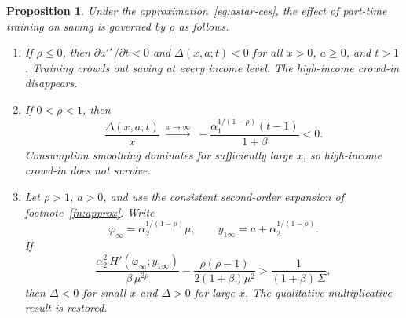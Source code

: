 \documentclass[12pt]{article}
\newtheorem{proposition}{Proposition}
\begin{document}
\begin{proposition}\label{prop:dadt-ces}
    Under the approximation~\eqref{eq:astar-ces}, the effect of part-time training on saving is governed by $\rho$ as follows.
    \begin{enumerate}
        \item If $\rho\le 0$, then $\partial a'^{\star}/\partial t<0$ and $\Delta(x,a;t)<0$ for all $x>0$, $a\ge 0$, and $t>1$. Training crowds out saving at every income level. The high-income crowd-in disappears.
        \item If $0<\rho<1$, then
        \begin{equation}
            \frac{\Delta(x,a;t)}{x}
            \;\xrightarrow{x\to\infty}\;
            -\frac{\alpha_1^{1/(1-\rho)}(t-1)}{1+\beta}<0.
            \label{eq:rho-lt-1-limit}
        \end{equation}
        Consumption smoothing dominates for sufficiently large $x$, so high-income crowd-in does not survive.
        \item Let $\rho>1$, $a>0$, and use the consistent second-order expansion of footnote~\ref{fn:approx}. Write
        \begin{equation}
            \varphi_{\infty}=\alpha_2^{1/(1-\rho)}\mu,
            \qquad
            y_{1\infty}=a+\alpha_2^{1/(1-\rho)}.
        \end{equation}
        If
        \begin{equation}
            \frac{\alpha_2^2\,H'(\varphi_{\infty};y_{1\infty})}{\beta\,\mu^{2\rho}}
            -\frac{\rho(\rho-1)}{2(1+\beta)\mu^{2}}
            >
            \frac{1}{(1+\beta)\,\Sigma},
            \label{eq:ces-sigma-star}
        \end{equation}
        then $\Delta<0$ for small $x$ and $\Delta>0$ for large $x$. The qualitative multiplicative result is restored.
    \end{enumerate}
\end{proposition}
\end{document}
